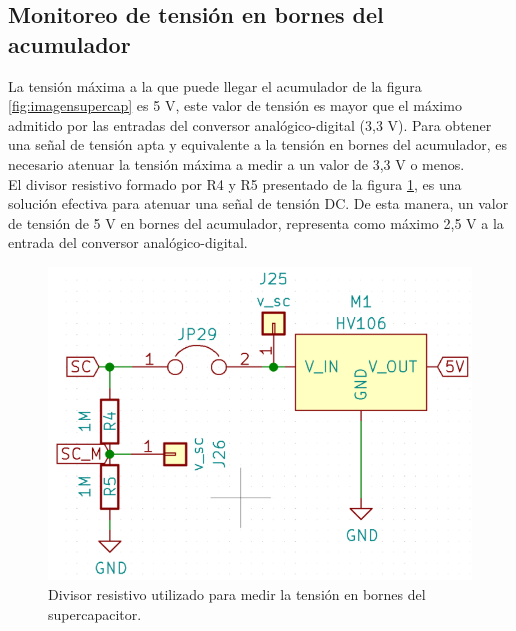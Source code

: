 \subsection{Monitoreo de tensión en bornes del acumulador}
La tensión máxima a la que puede llegar el acumulador de la figura \ref{fig:imagensupercap} es 5 V, este valor de tensión es mayor que el máximo admitido por las entradas del conversor analógico-digital (3,3 V). Para obtener una señal de tensión apta y equivalente a la tensión en bornes del acumulador, es necesario atenuar la tensión máxima a medir a un valor de 3,3 V o menos.\\
El divisor resistivo formado por R4 y R5 presentado de la figura \ref{fig:ctodivisorresistivo}, es una solución efectiva para atenuar una señal de tensión DC. De esta manera, un valor de tensión de 5 V en bornes del acumulador, representa como máximo 2,5 V a la entrada del conversor analógico-digital.
\begin{figure}[h!]
	\centering
	\includegraphics[width=0.6\linewidth]{Figures/cto_divisor_resistivo}
	\caption{Divisor resistivo utilizado para medir la tensión en bornes del supercapacitor.}
	\label{fig:ctodivisorresistivo}
\end{figure}

